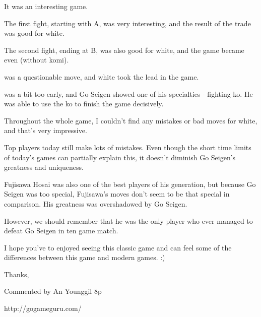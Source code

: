 \documentclass[letterpaper,12pt]{memoir}
\begin{document}
It was an interesting game.

The first fight, starting with A, was very interesting, and the result of the trade was good for white.

The second fight, ending at B, was also good for white, and the game became even (without komi).

{} was a questionable move, and white took the lead in the game.

{} was a bit too early, and Go Seigen showed one of his specialties - fighting ko. He was able to use the ko to finish the game decisively.

Throughout the whole game, I couldn't find any mistakes or bad moves for white, and that's very impressive.

Top players today still make lots of mistakes. Even though the short time limits of today's games can partially explain this, it doesn't diminish Go Seigen's greatness and uniqueness.

Fujisawa Hosai was also one of the best players of his generation, but because Go Seigen was too special, Fujisawa's moves don't seem to be that special in comparison. His greatness was overshadowed by Go Seigen.

However, we should remember that he was the only player who ever managed to defeat Go Seigen in ten game match.

I hope you've to enjoyed seeing this classic game and can feel some of the differences between this game and modern games. :)

Thanks, 

Commented by An Younggil 8p

http://gogameguru.com/


\vfill
\end{document}
